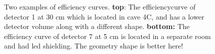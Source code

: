 \begin{figure}%
    \centering
    
    \caption{Two examples of efficiency curves. \textbf{top}: The efficiencycurve of detector 1 at 30 cm which is located in cave 4C, and has a lower detector volume along with a different shape. \textbf{bottom:} The efficiency curve of detector 7 at 5 cm is located in a separate room and had led shielding. The geometry shape is better here!  }%
    \label{fig:efficiency_curves}%
\end{figure}





